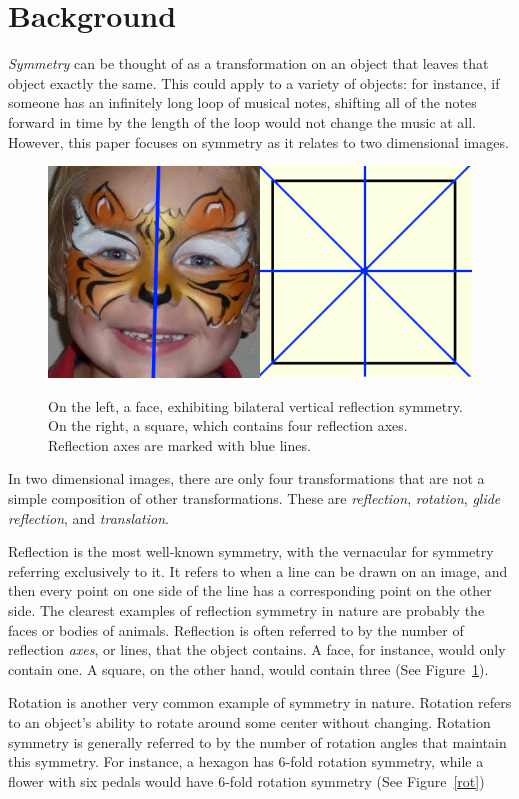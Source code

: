 \section{Background}
\textit{Symmetry} can be thought of as a transformation on an object that leaves that object exactly the same. This could apply to a variety of objects: for instance, if someone has an infinitely long loop of musical notes, shifting all of the notes forward in time by the length of the loop would not change the music at all. However, this paper focuses on symmetry as it relates to two dimensional images.

\begin{figure}
\centering
\includegraphics[width=0.9\columnwidth]{reflection}
\label{ref}
\caption{On the left, a face, exhibiting bilateral vertical reflection symmetry. On the right, a square, which contains four reflection axes. Reflection axes are marked with blue lines.}
\end{figure}

In two dimensional images, there are only four transformations that are not a simple composition of other transformations. These are \textit{reflection}, \textit{rotation}, \textit{glide reflection}, and \textit{translation}.

Reflection is the most well-known symmetry, with the vernacular for symmetry referring exclusively to it. It refers to when a line can be drawn on an image, and then every point on one side of the line has a corresponding point on the other side. The clearest examples of reflection symmetry in nature are probably the faces or bodies of animals. Reflection is often referred to by the number of reflection \textit{axes}, or lines, that the object contains. A face, for instance, would only contain one. A square, on the other hand, would contain three (See Figure~\ref{ref}).


Rotation is another very common example of symmetry in nature. Rotation refers to an object's ability to rotate around some center without changing. Rotation symmetry is generally referred to by the number of rotation angles that maintain this symmetry. For instance, a hexagon has 6-fold rotation symmetry, while a flower with six pedals would have 6-fold rotation symmetry (See Figure~\ref{rot})

